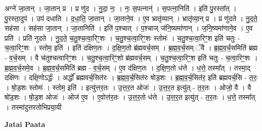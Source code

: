 \documentclass[17pt]{extarticle}
\begin{document}
अग्ने॑ जा॒तान् । जा॒तान् प्र । प्र णु॑द । नु॒दा॒ नः॒ । नः॒ स॒पत्नान्॑ । स॒पत्ना॒निति॑ । इति॑ पु॒रस्ता᳚त् । पु॒रस्ता॒दुप॑ । उप॑ दधाति । द॒धा॒ति॒ जा॒तान् । जा॒ताने॒व । ए॒व भ्रातृ॑व्यान् । भ्रातृ॑व्या॒न् प्र । प्र णु॑दते । नु॒द॒ते॒ सह॑सा । सह॑सा जा॒तान् । जा॒तानिति॑ । इति॑ प॒श्चात् । प॒श्चाज् ज॑नि॒ष्यमा॑णान् । ज॒नि॒ष्यमा॑णाने॒व । ए॒व प्रति॑ । प्रति॑ नुदते । नु॒द॒ते॒ च॒तु॒श्च॒त्वा॒रिꣳ॒॒शः । च॒तु॒श्च॒त्वा॒रिꣳ॒॒शः स्तोमः॑ । च॒तु॒श्च॒त्वा॒रिꣳ॒॒श इति॑ चतुः - च॒त्वा॒रिꣳ॒॒शः । स्तोम॒ इति॑ । इति॑ दक्षिण॒तः । द॒क्षि॒ण॒तो ब्र॑ह्मवर्च॒सम् । ब्र॒ह्म॒व॒र्च॒सम् ॅवै । ब्र॒ह्म॒व॒र्च॒समिति॑ ब्रह्म - व॒र्च॒सम् । वै च॑तुश्चत्वारिꣳ॒॒शः । च॒तु॒श्च॒त्वा॒रिꣳ॒॒शो ब्र॑ह्मवर्च॒सम् । च॒तु॒श्च॒त्वा॒रिꣳ॒॒श इति॑ चतुः - च॒त्वा॒रिꣳ॒॒शः । ब्र॒ह्म॒व॒र्च॒समे॒व । ब्र॒ह्म॒व॒र्च॒समिति॑ ब्रह्म - व॒र्च॒सम् । ए॒व द॑क्षिण॒तः । द॒क्षि॒ण॒तो ध॑त्ते । ध॒त्ते॒ तस्मा᳚त् । तस्मा॒द् दक्षि॑णः । दक्षि॒णोऽर्द्धः॑ । अर्द्धो᳚ ब्रह्मवर्च॒सित॑रः । ब्र॒ह्म॒व॒र्च॒सित॑रः षोड॒शः । ब्र॒ह्म॒व॒र्च॒सित॑र॒ इति॑ ब्रह्मवर्च॒सि - त॒रः॒ । षो॒ड॒शः स्तोमः॑ । स्तोम॒ इति॑ । इत्यु॑त्तर॒तः । उ॒त्त॒र॒त ओजः॑ । उ॒त्त॒र॒त इत्यु॑त् - त॒र॒तः । ओजो॒ वै । वै षो॑ड॒शः । षो॒ड॒श ओजः॑ । ओज॑ ए॒व । ए॒वोत्त॑र॒तः । उ॒त्त॒र॒तो ध॑त्ते । उ॒त्त॒र॒त इत्यु॑त् - त॒र॒तः । ध॒त्ते॒ तस्मा᳚त् । तस्मा॑दुत्तरतोभिप्रया॒यी \newline

\textbf{Jatai Paata} \newline
\end{document}
